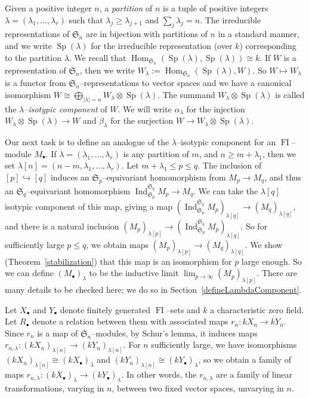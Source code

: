 \documentclass[ALCO,ThmDefs,Unicode,epreuves]{cedram}
\DeclareMathOperator{\FI}{FI}
\DeclareMathOperator{\Hom}{Hom}
\DeclareMathOperator{\Ind}{Ind}
\DeclareMathOperator{\Sp}{Sp}
\newcommand{\Sn}{\mathfrak{S}}
\newcommand{\dt}{\bullet}
\newcommand{\into}{\hookrightarrow}
\begin{document}
Given a positive integer $n$, a \emph{partition} of $n$ is a tuple of positive integers $\lambda = (\lambda_1,\ldots,\lambda_r)$ such that $\lambda_j \geq \lambda_{j+1}$ and $\sum_j \lambda_j = n$. The irreducible representations of $\Sn_n$ are in bijection with partitions of $n$ in a standard manner, and we write $\Sp(\lambda)$ for the irreducible representation (over $k$) corresponding to the partition $\lambda$. We recall that $\Hom_{\Sn_n}(\Sp(\lambda), \Sp(\lambda)) \cong k$. If $W$ is a representation of $\Sn_n$, then we write $W_{\lambda} := \Hom_{\Sn_n}(\Sp(\lambda), W)$. So $W \mapsto W_{\lambda}$ is a functor from $\Sn_n$--representations to vector spaces and we have a canonical isomorphism $W \cong \bigoplus_{|\lambda|=n} W_{\lambda} \otimes \Sp(\lambda)$. The summand $W_{\lambda} \otimes \Sp(\lambda)$ is called the \emph{$\lambda$--isotypic component} of $W$.
We will write $\alpha_{\lambda}$ for the injection $W_{\lambda} \otimes \Sp(\lambda) \to W$ and $\beta_{\lambda}$ for the surjection $W \to W_{\lambda} \otimes \Sp(\lambda)$.

Our next task is to define an analogue of the $\lambda$--isotypic component for an $\FI$--module $M_{\dt}$. 
If $\lambda=(\lambda_1,\ldots,\lambda_r)$ is any partition of $m$, and $n \geq m + \lambda_1$, then we set $\lambda[n] = (n - m, \lambda_1,\ldots,\lambda_r)$.
Let $m+\lambda_1 \leq p \leq q$. The inclusion of $[p] \into [q]$ induces an $\Sn_{p}$--equivariant homomorphism from $M_{p} \to M_{q}$, and thus an $\Sn_{q}$--equivariant homomorphism $\Ind_{\Sn_p}^{\Sn_q} M_p \to M_q$. We can take the $\lambda[q]$ isotypic component of this map, giving a map $\left( \Ind_{\Sn_p}^{\Sn_q} M_p \right)_{\lambda[q]} \to \left( M_q \right)_{\lambda[q]}$, and there is a natural inclusion $\left( M_p \right)_{\lambda[p]} \to \left( \Ind_{\Sn_p}^{\Sn_q} M_p \right)_{\lambda[q]}$. So for sufficiently large $p \leq q$, we obtain maps $\left( M_p \right)_{\lambda[p]} \to \left( M_q \right)_{\lambda[q]}$. We show (Theorem~\ref{stabilization}) that this map is an isomorphism for $p$ large enough. So we can define $(M_{\dt})_{\lambda}$ to be the inductive limit $\lim_{p \to \infty} (M_p)_{\lambda[p]}$. There are many details to be checked here; we do so in Section~\ref{defineLambdaComponent}.

Let $X_\dt$ and $Y_\dt$ denote finitely generated $\FI$--sets and $k$ a characteristic zero field. 
Let $R_\dt$ denote a relation between them with associated maps $r_n:k X_n \rightarrow k Y_n$.
Since $r_n$ is a map of $\Sn_n$--modules, by Schur's lemma, it induces maps $r_{n, \lambda} : (k X_{n})_{\lambda[n]} \to (k Y_{n})_{\lambda[n]}$. 
For $n$ sufficiently large, we have isomorphisms $(k X_n)_{\lambda[n]} \cong (kX_{\dt})_{\lambda}$ and $(k Y_n)_{\lambda[n]} \cong (kY_{\dt})_{\lambda}$, so we obtain a family of maps 
$r_{n, \lambda}: (k X_{\dt})_{\lambda} \longrightarrow (k Y_{\dt})_{\lambda}$. In other words, the $r_{n,\lambda}$ are a family of linear transformations, varying in $n$, between two fixed vector spaces, unvarying in $n$.
\end{document}
